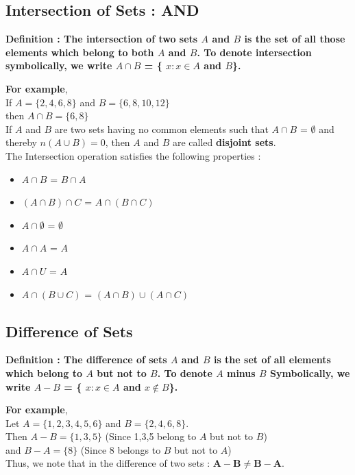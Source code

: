 \documentclass[12pt, letterpaper]{article}
\begin{document}
\subsection{Intersection of Sets : AND}
\begin{displayquote}
\textbf{Definition : The intersection of two sets $A$ and $B$ is the set of all those elements which belong to both $A$ and $B$. To denote intersection symbolically, we write $A \cap B$ = \{ $x : x \in A$ and $B$\}.}
\end{displayquote}
\textbf{For example},\\ 
If $A = \{2,4,6,8\}$ and $B = \{6,8,10,12\}$\\
then $A \cap B = \{6,8\}$\\
If $A$ and $B$ are two sets having no common elements such that $A \cap B$ = $\emptyset$ and thereby $n(A \cup B) = 0$, then $A$ and $B$ are called \textbf{disjoint sets}.\\
The Intersection operation satisfies the following properties : 
\begin{itemize}
    \item $A \cap B$ = $B \cap A$
    \item $(A \cap B) \cap C$ = $A \cap (B \cap C)$
    \item $A \cap \emptyset$ = $\emptyset$
    \item $A \cap A$ = $A$
    \item $A \cap U$ = $A$
    \item $A \cap (B \cup C)$ = $(A \cap B) \cup (A \cap C)$
\end{itemize}

\subsection{Difference of Sets}
\begin{displayquote}
\textbf{Definition : The difference of sets $A$ and $B$ is the set of all elements which belong to $A$ but not to $B$. To denote $A$ minus $B$ Symbolically, we write $A - B$ = \{ $x : x \in A$ and $x \notin B$\}.}
\end{displayquote}
\textbf{For example},\\ 
Let $A = \{1,2,3,4,5,6\}$ and $B = \{2,4,6,8\}$.\\
Then $A-B = \{1,3,5\}$ (Since 1,3,5 belong to $A$ but not to $B$)\\
and $B-A = \{8\}$ (Since 8 belongs to $B$ but not to $A$)\\
Thus, we note that in the difference of two sets : $\mathbf{A-B \neq B-A}$.
\end{document}
